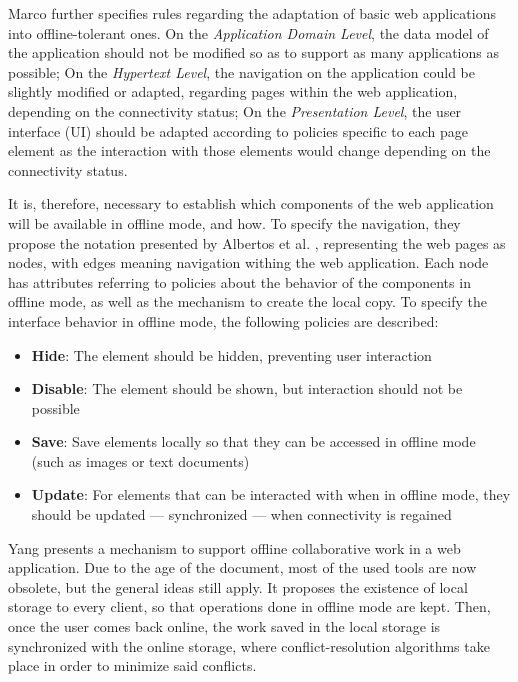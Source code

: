 Marco \cite{Marco2015} further specifies rules regarding the adaptation of basic web applications into offline-tolerant ones. On the \textit{Application Domain Level}, the data model of the application should not be modified so as to support as many applications as possible; On the \textit{Hypertext Level}, the navigation on the application could be slightly modified or adapted, regarding pages within the web application, depending on the connectivity status; On the \textit{Presentation Level}, the user interface (UI) should be adapted according to policies specific to each page element as the interaction with those elements would change depending on the connectivity status.

It is, therefore, necessary to establish which components of the web application will be available in offline mode, and how.
To specify the navigation, they propose the notation presented by Albertos et al. \cite{Penichet2013}, representing the web pages as nodes, with edges meaning navigation withing the web application. Each node has attributes referring to policies about the behavior of the components in offline mode, as well as the mechanism to create the local copy. To specify the interface behavior in offline mode, the following policies are described:

\begin{itemize}
    \item \textbf{Hide}: The element should be hidden, preventing user interaction
    \item \textbf{Disable}: The element should be shown, but interaction should not be possible
    \item \textbf{Save}: Save elements locally so that they can be accessed in offline mode (such as images or text documents)
    \item \textbf{Update}: For elements that can be interacted with when in offline mode, they should be updated --- synchronized --- when connectivity is regained
\end{itemize}

Yang \cite{Yang2000} presents a mechanism to support offline collaborative work in a web application. Due to the age of the document, most of the used tools are now obsolete, but the general ideas still apply. It proposes the existence of local storage to every client, so that operations done in offline mode are kept. Then, once the user comes back online, the work saved in the local storage is synchronized with the online storage, where conflict-resolution algorithms take place in order to minimize said conflicts.

